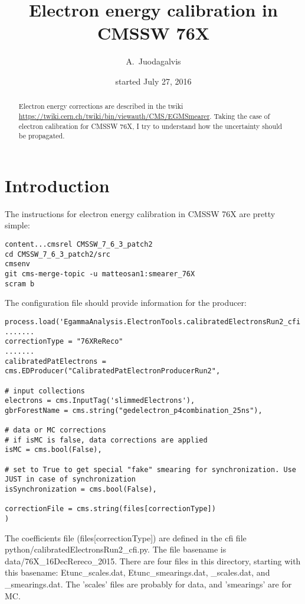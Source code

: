 \documentclass[11pt]{article}
\title{Electron energy calibration in CMSSW 76X}
\author{A.~Juodagalvis}
\date{started July 27, 2016}
\begin{document}
\maketitle

\begin{abstract}
	Electron energy corrections are described in the twiki \url{https://twiki.cern.ch/twiki/bin/viewauth/CMS/EGMSmearer}. Taking the case of electron calibration for CMSSW 76X, I try to understand how the uncertainty should be propagated.
\end{abstract}

\section{Introduction}

The instructions for electron energy calibration in CMSSW 76X are pretty simple:
\begin{verbatim}
content...cmsrel CMSSW_7_6_3_patch2
cd CMSSW_7_6_3_patch2/src
cmsenv
git cms-merge-topic -u matteosan1:smearer_76X
scram b
\end{verbatim}

The configuration file should provide information for the producer:
\begin{verbatim}
process.load('EgammaAnalysis.ElectronTools.calibratedElectronsRun2_cfi')
.......
correctionType = "76XReReco"
.......
calibratedPatElectrons = cms.EDProducer("CalibratedPatElectronProducerRun2",

# input collections
electrons = cms.InputTag('slimmedElectrons'),
gbrForestName = cms.string("gedelectron_p4combination_25ns"),

# data or MC corrections
# if isMC is false, data corrections are applied
isMC = cms.bool(False),

# set to True to get special "fake" smearing for synchronization. Use JUST in case of synchronization
isSynchronization = cms.bool(False),

correctionFile = cms.string(files[correctionType])
)
\end{verbatim}

The coefficients file (files[correctionType]) are defined in the cfi
file python/calibratedElectronsRun2\_cfi.py. The file basename is
data/76X\_16DecRereco\_2015. There are four files in this directory,
starting with this basename: Etunc\_scales.dat, Etunc\_smearings.dat,
\_scales.dat, and \_smearings.dat. The 'scales' files are probably for
data, and 'smearings' are for MC.
\end{document}
